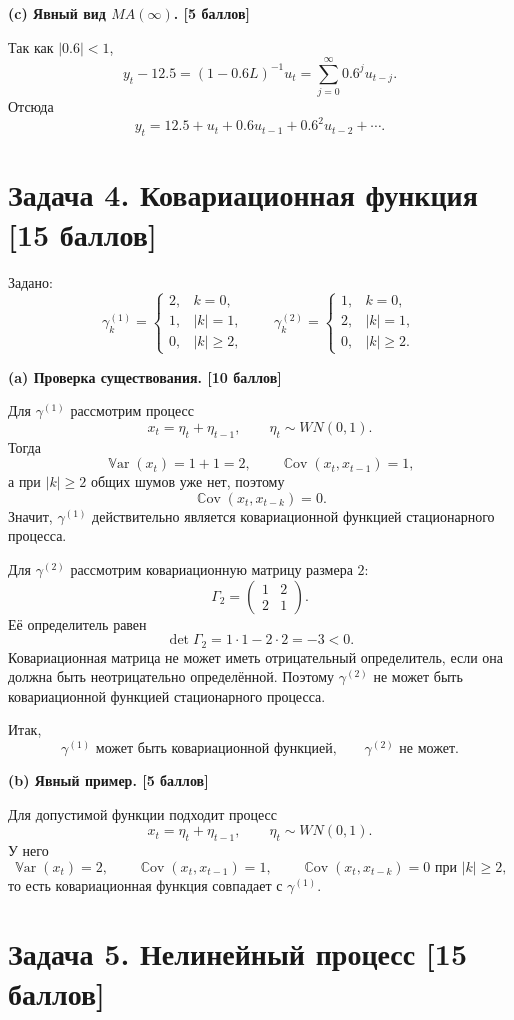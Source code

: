 \documentclass[12pt]{article}
\DeclareMathOperator{\Cov}{\mathbb{C}ov}
\DeclareMathOperator{\Var}{\mathbb{V}ar}
\newcommand{\step}[1]{\medskip\noindent\textbf{#1}\par\nobreak\vspace{2pt}}
\begin{document}
\step{(c) Явный вид $MA(\infty)$. \hfill [5 баллов]}
Так как $|0.6|<1$,
\[
y_t-12.5=(1-0.6L)^{-1}u_t=\sum_{j=0}^{\infty}0.6^j u_{t-j}.
\]
Отсюда
\[
\boxed{y_t=12.5+u_t+0.6u_{t-1}+0.6^2u_{t-2}+\cdots.}
\]

\section*{Задача 4. Ковариационная функция \hfill [15 баллов]}

Задано:
\[
\gamma_k^{(1)}=
\begin{cases}
2, & k=0,\\
1, & |k|=1,\\
0, & |k|\ge 2,
\end{cases}
\qquad
\gamma_k^{(2)}=
\begin{cases}
1, & k=0,\\
2, & |k|=1,\\
0, & |k|\ge 2.
\end{cases}
\]

\step{(a) Проверка существования. \hfill [10 баллов]}
Для $\gamma^{(1)}$ рассмотрим процесс
\[
x_t=\eta_t+\eta_{t-1},\qquad \eta_t\sim WN(0,1).
\]
Тогда
\[
\Var(x_t)=1+1=2,\qquad \Cov(x_t,x_{t-1})=1,
\]
а при $|k|\ge 2$ общих шумов уже нет, поэтому
\[
\Cov(x_t,x_{t-k})=0.
\]
Значит, $\gamma^{(1)}$ действительно является ковариационной функцией стационарного процесса.

Для $\gamma^{(2)}$ рассмотрим ковариационную матрицу размера $2$:
\[
\Gamma_2=
\begin{pmatrix}
1 & 2\\
2 & 1
\end{pmatrix}.
\]
Её определитель равен
\[
\det \Gamma_2 = 1\cdot 1 - 2\cdot 2 = -3 < 0.
\]
Ковариационная матрица не может иметь отрицательный определитель, если она должна быть неотрицательно определённой. Поэтому $\gamma^{(2)}$ не может быть ковариационной функцией стационарного процесса.

Итак,
\[
\boxed{\gamma^{(1)}\text{ может быть ковариационной функцией,}\qquad \gamma^{(2)}\text{ не может.}}
\]

\step{(b) Явный пример. \hfill [5 баллов]}
Для допустимой функции подходит процесс
\[
\boxed{x_t=\eta_t+\eta_{t-1},\qquad \eta_t\sim WN(0,1).}
\]
У него
\[
\Var(x_t)=2,\qquad \Cov(x_t,x_{t-1})=1,\qquad \Cov(x_t,x_{t-k})=0 \text{ при } |k|\ge 2,
\]
то есть ковариационная функция совпадает с $\gamma^{(1)}$.

\section*{Задача 5. Нелинейный процесс \hfill [15 баллов]}
\end{document}
